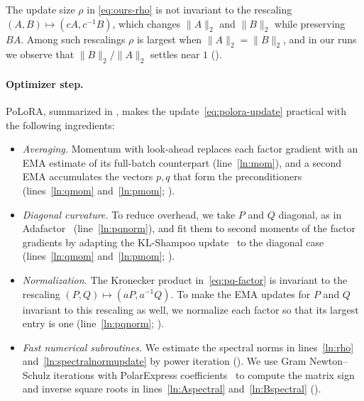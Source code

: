 \documentclass[11pt]{article}
\newcommand{\norm}[1]{\| #1\|}
\newcommand{\methodname}{PoLoRA\xspace}
\theoremstyle{plain}
\theoremstyle{definition}
\theoremstyle{remark}
\theoremstyle{definition}
\begin{document}
The update size $\rho$ in \eqref{eq:ours-rho} is not invariant to the rescaling $(A,B)\mapsto(cA,c^{-1}B)$, which changes $\norm{A}_2$ and $\norm{B}_2$ while preserving $BA$. Among such rescalings $\rho$ is largest when $\norm{A}_2=\norm{B}_2$, and in our runs we observe that $\norm{B}_2/\norm{A}_2$ settles near $1$ ().
\paragraph{Optimizer step.}
\methodname{}, summarized in , makes the update~\eqref{eq:polora-update} practical with the following ingredients:
\begin{itemize}[leftmargin=1.5em,itemsep=1pt,topsep=2pt]
  \item \emph{Averaging.} Momentum with look-ahead replaces each factor gradient with an EMA estimate of its full-batch counterpart (line~\ref{ln:mom}), and a second EMA accumulates the vectors $p,q$ that form the preconditioners (lines~\ref{ln:qmom} and~\ref{ln:pmom}; ).  \item \emph{Diagonal curvature.} To reduce overhead, we take $P$ and $Q$ diagonal, as in Adafactor~\cite{adafactor} (line~\ref{ln:pqnorm}), and fit them to second moments of the factor gradients by adapting the KL-Shampoo update~\cite{klshampoo} to the diagonal case (lines~\ref{ln:qmom} and~\ref{ln:pmom}; ).
  \item \emph{Normalization.} The Kronecker product in~\eqref{eq:pq-factor} is invariant to the rescaling $(P,Q)\mapsto(aP,a^{-1}Q)$. To make the EMA updates for $P$ and $Q$ invariant to this rescaling as well, we normalize each factor so that its largest entry is one (line~\ref{ln:pqnorm}; ).
  \item \emph{Fast numerical subroutines.} We estimate the spectral norms in lines~\ref{ln:rho} and~\ref{ln:spectralnormupdate} by power iteration (). We use Gram Newton--Schulz iterations with PolarExpress coefficients~\cite{polarexpress} to compute the matrix sign and inverse square roots in lines~\ref{ln:Aspectral} and~\ref{ln:Bspectral} ().
\end{itemize}
\end{document}
